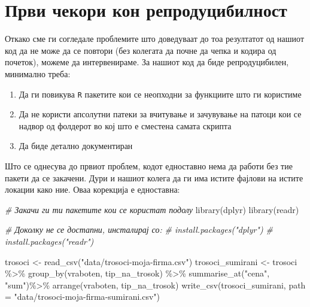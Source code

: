 \documentclass[
]{book}
\newenvironment{Shaded}{\begin{snugshade}}{\end{snugshade}}
\newcommand{\AttributeTok}[1]{\textcolor[rgb]{0.77,0.63,0.00}{#1}}
\newcommand{\CommentTok}[1]{\textcolor[rgb]{0.56,0.35,0.01}{\textit{#1}}}
\newcommand{\FunctionTok}[1]{\textcolor[rgb]{0.00,0.00,0.00}{#1}}
\newcommand{\NormalTok}[1]{#1}
\newcommand{\OtherTok}[1]{\textcolor[rgb]{0.56,0.35,0.01}{#1}}
\newcommand{\SpecialCharTok}[1]{\textcolor[rgb]{0.00,0.00,0.00}{#1}}
\newcommand{\StringTok}[1]{\textcolor[rgb]{0.31,0.60,0.02}{#1}}
\begin{document}
\hypertarget{ux43fux440ux432ux438-ux447ux435ux43aux43eux440ux438-ux43aux43eux43d-ux440ux435ux43fux440ux43eux434ux443ux446ux438ux431ux438ux43bux43dux43eux441ux442}{%
\section{Први чекори кон репродуцибилност}\label{ux43fux440ux432ux438-ux447ux435ux43aux43eux440ux438-ux43aux43eux43d-ux440ux435ux43fux440ux43eux434ux443ux446ux438ux431ux438ux43bux43dux43eux441ux442}}

Откако сме ги согледале проблемите што доведуваат до тоа резултатот од нашиот код да не може да се повтори (без колегата да почне да чепка и кодира од почеток), можеме да интервенираме. За нашиот код да биде репродуцибилен, минимално треба:

\begin{enumerate}
\def\labelenumi{\arabic{enumi}.}
\item
  Да ги повикува \texttt{R} пакетите кои се неопходни за функциите што ги користиме
\item
  Да не користи апсолутни патеки за вчитување и зачувување на патоци кои се надвор од фолдерот во кој што е сместена самата скрипта
\item
  Да биде детално документиран
\end{enumerate}

Што се однесува до првиот проблем, кодот едноставно нема да работи без тие пакети да се закачени. Дури и нашиот колега да ги има истите фајлови на истите локации како ние. Оваа корекција е едноставна:

\begin{Shaded}
\begin{Highlighting}[]
\CommentTok{\# Закачи ги ти пакетите кои се користат подолу }
\FunctionTok{library}\NormalTok{(dplyr)}
\FunctionTok{library}\NormalTok{(readr)}

\CommentTok{\# Доколку не се достапни, инсталирај со:}
\CommentTok{\# install.packages("dplyr")}
\CommentTok{\# install.packages("readr")}

\NormalTok{trosoci }\OtherTok{\textless{}{-}} \FunctionTok{read\_csv}\NormalTok{(}\StringTok{"data/trosoci{-}moja{-}firma.csv"}\NormalTok{)}
\NormalTok{trosoci\_sumirani }\OtherTok{\textless{}{-}}\NormalTok{ trosoci }\SpecialCharTok{\%\textgreater{}\%} 
  \FunctionTok{group\_by}\NormalTok{(vraboten, tip\_na\_trosok) }\SpecialCharTok{\%\textgreater{}\%} 
  \FunctionTok{summarise\_at}\NormalTok{(}\StringTok{"cena"}\NormalTok{, }\StringTok{"sum"}\NormalTok{)}\SpecialCharTok{\%\textgreater{}\%} 
  \FunctionTok{arrange}\NormalTok{(vraboten, tip\_na\_trosok)}
\FunctionTok{write\_csv}\NormalTok{(trosoci\_sumirani, }
          \AttributeTok{path =} \StringTok{"data/trosoci{-}moja{-}firma{-}sumirani.csv"}\NormalTok{)}
\end{Highlighting}
\end{Shaded}
\end{document}
